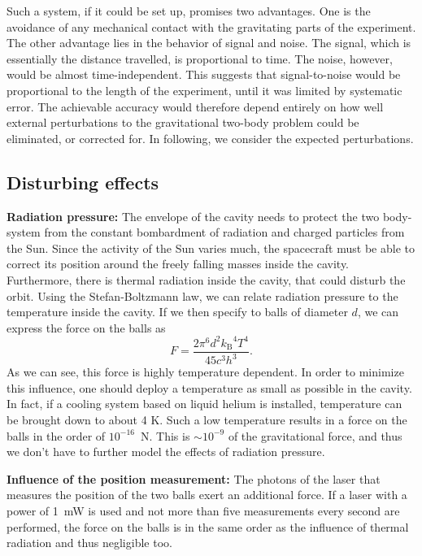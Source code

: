 \documentclass[onecolumn]{aa} %
\begin{document}
Such a system, if it could be set up, promises two advantages.  One is
the avoidance of any mechanical contact with the gravitating parts of
the experiment.  The other advantage lies in the behavior of signal
and noise.  The signal, which is essentially the distance travelled,
is proportional to time. The noise, however, would be almost
time-independent. This suggests that signal-to-noise would be
proportional to the length of the experiment, until it was limited by
systematic error. The achievable accuracy would therefore depend
entirely on how well external perturbations to the gravitational
two-body problem could be eliminated, or corrected for.  In following,
we consider the expected perturbations.

\subsection{Disturbing effects}

\textbf{Radiation pressure:} The envelope of the cavity needs to protect the two body-system from the constant bombardment of radiation and charged particles from the Sun. Since the activity of the Sun varies much, the spacecraft must be able to correct its position around the freely falling masses inside the cavity.\\
Furthermore, there is thermal radiation inside the cavity, that could disturb the orbit.
Using the Stefan-Boltzmann law, we can relate radiation pressure to the temperature inside the cavity. If we then specify to balls of diameter $d$, we can express the force on the balls as 
\begin{equation}
F = \frac{2 \pi^6 d^2 {k_\mathrm{B}}^4 T^4}{45 c^3 h^3}.
\end{equation}
As we can see, this force is highly temperature dependent. In order to minimize this influence, one should deploy a temperature as small as possible in the cavity. In fact, if a cooling system based on liquid helium is installed, temperature can be brought down to about 4 K. Such a low temperature results in a force on the balls in the order of $10^{-16}$~N.   This is $\sim10^{-9}$ of the gravitational force, and thus we don't have to further model the effects of radiation pressure.

\textbf{Influence of the position measurement:} 
The photons of the laser that measures the position of the two balls exert an additional force. If a laser with a power of 1~mW is used and not more than five measurements every second are performed, the force on the balls is in the same order as the influence of thermal radiation and thus negligible too.
\end{document}
